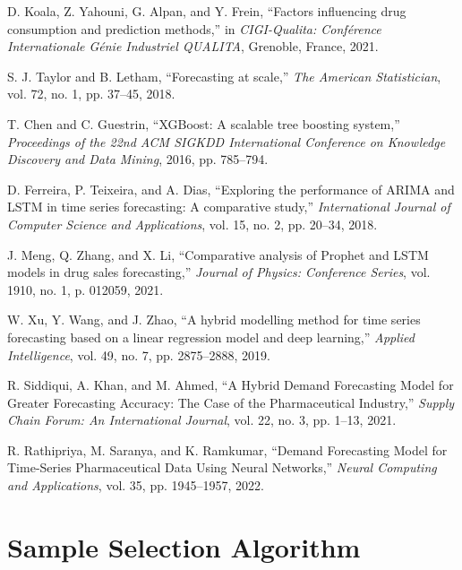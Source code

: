 \documentclass[journal]{IEEEtran}
\begin{document}
\begin{thebibliography}{99}

    D. Koala, Z. Yahouni, G. Alpan, and Y. Frein, “Factors influencing drug consumption and prediction methods,” in \textit{CIGI-Qualita: Conférence Internationale Génie Industriel QUALITA}, Grenoble, France, 2021.
    
    S. J. Taylor and B. Letham, “Forecasting at scale,” \textit{The American Statistician}, vol. 72, no. 1, pp. 37–45, 2018.

    T. Chen and C. Guestrin, “XGBoost: A scalable tree boosting system,” \textit{Proceedings of the 22nd ACM SIGKDD International Conference on Knowledge Discovery and Data Mining}, 2016, pp. 785–794.

    D. Ferreira, P. Teixeira, and A. Dias, “Exploring the performance of ARIMA and LSTM in time series forecasting: A comparative study,” \textit{International Journal of Computer Science and Applications}, vol. 15, no. 2, pp. 20–34, 2018.

    J. Meng, Q. Zhang, and X. Li, “Comparative analysis of Prophet and LSTM models in drug sales forecasting,” \textit{Journal of Physics: Conference Series}, vol. 1910, no. 1, p. 012059, 2021.

    W. Xu, Y. Wang, and J. Zhao, “A hybrid modelling method for time series forecasting based on a linear regression model and deep learning,” \textit{Applied Intelligence}, vol. 49, no. 7, pp. 2875–2888, 2019.

    R. Siddiqui, A. Khan, and M. Ahmed, “A Hybrid Demand Forecasting Model for Greater Forecasting Accuracy: The Case of the Pharmaceutical Industry,” \textit{Supply Chain Forum: An International Journal}, vol. 22, no. 3, pp. 1–13, 2021.

    R. Rathipriya, M. Saranya, and K. Ramkumar, “Demand Forecasting Model for Time-Series Pharmaceutical Data Using Neural Networks,” \textit{Neural Computing and Applications}, vol. 35, pp. 1945–1957, 2022.

\end{thebibliography}

\appendix
\section{Sample Selection Algorithm}
\label{appendix:sample-selection}
\end{document}
